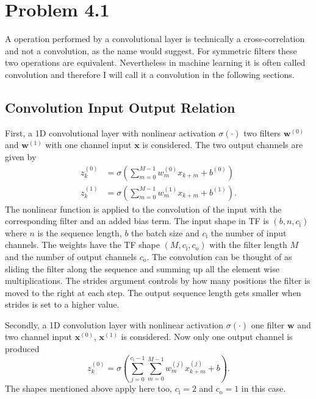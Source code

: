 \documentclass[12pt,a4paper]{scrartcl}
\newcommand{\matr}[1]{\mathbf{#1}}
\begin{document}
	
	\section*{Problem 4.1}
	
	A operation performed by a convolutional layer is technically a cross-correlation and not a convolution, as the name would suggest. For symmetric filters these two operations are equivalent. Nevertheless in machine learning it is often called convolution and therefore I will call it a convolution in the following sections. 
		
	\subsection*{Convolution Input Output Relation}
	
	First, a 1D convolutional layer with nonlinear activation $\sigma(\cdot)$ two filters $\matr{w}^{(0)}$ and $\matr{w}^{(1)}$ with one channel input $\matr{x}$ is considered. 
	The two output channels are given by
	\begin{align}
		z_k^{(0)} &= \sigma\left(\sum_{m=0}^{M-1} w_m^{(0)} x_{k+m} + b^{(0)} \right) \\
		z_k^{(1)} &= \sigma\left(\sum_{m=0}^{M-1} w_m^{(1)} x_{k+m} + b^{(1)} \right).
	\end{align}
	The nonlinear function is applied to the convolution of the input with the corresponding filter and an added bias term. 		
	The input shape in TF is $(b,n,c_\mathrm{i})$ where $n$ is the sequence length, $b$ the batch size and $c_\mathrm{i}$ the number of input channels.
	The weights have the TF shape $(M,c_\mathrm{i},c_\mathrm{o})$ with the filter length $M$ and the number of output channels $c_\mathrm{o}$.
	The convolution can be thought of as sliding the filter along the sequence and summing up all the element wise multiplications. The strides argument controls by how many positions the filter is moved to the right at each step. The output sequence length gets smaller when strides is set to a higher value.
	
	
	Secondly, a 1D convolution layer with nonlinear activation $\sigma(\cdot)$ one filter $\matr{w}$ and two channel input $\matr{x}^{(0)}$, $\matr{x}^{(1)}$ is considered.
	Now only one output channel is produced
	\begin{equation}
		z_k^{(0)}  = \sigma\left( \sum_{j=0}^{c_\mathrm{i}-1} \sum_{m=0}^{M-1}  w_{m}^{(j)} x_{k+m}^{(j)} + b\right).
	\end{equation}
	The shapes mentioned above apply here too, $c_\mathrm{i}=2$ and $c_\mathrm{o}=1$ in this case.
	
\end{document}
